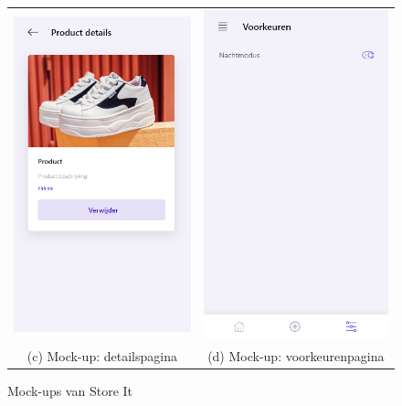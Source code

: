 \begin{figure}
\begin{tabular}{cc}
        \includegraphics[width=65mm]{img/methodologie/mock-details_screen.png} &   \includegraphics[width=65mm]{img/methodologie/mock-preferences.png} \\
        (c) Mock-up: detailspagina & (d) Mock-up: voorkeurenpagina \\[6pt]
    \end{tabular}
    \caption{Mock-ups van Store It}
    \label{fig:mock-ups-store-it}
\end{figure}


